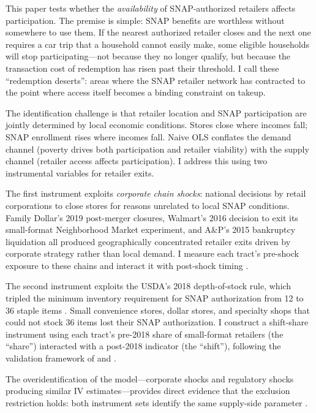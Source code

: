 \documentclass[12pt]{article}
\begin{document}
This paper tests whether the \textit{availability} of SNAP-authorized retailers affects participation. The premise is simple: SNAP benefits are worthless without somewhere to use them. If the nearest authorized retailer closes and the next one requires a car trip that a household cannot easily make, some eligible households will stop participating---not because they no longer qualify, but because the transaction cost of redemption has risen past their threshold. I call these ``redemption deserts'': areas where the SNAP retailer network has contracted to the point where access itself becomes a binding constraint on takeup.

The identification challenge is that retailer location and SNAP participation are jointly determined by local economic conditions. Stores close where incomes fall; SNAP enrollment rises where incomes fall. Naive OLS conflates the demand channel (poverty drives both participation and retailer viability) with the supply channel (retailer access affects participation). I address this using two instrumental variables for retailer exits.

The first instrument exploits \textit{corporate chain shocks}: national decisions by retail corporations to close stores for reasons unrelated to local SNAP conditions. Family Dollar's 2019 post-merger closures, Walmart's 2016 decision to exit its small-format Neighborhood Market experiment, and A\&P's 2015 bankruptcy liquidation all produced geographically concentrated retailer exits driven by corporate strategy rather than local demand. I measure each tract's pre-shock exposure to these chains and interact it with post-shock timing \citep{borusyak2022}.

The second instrument exploits the USDA's 2018 depth-of-stock rule, which tripled the minimum inventory requirement for SNAP authorization from 12 to 36 staple items \citep{fns2018}. Small convenience stores, dollar stores, and specialty shops that could not stock 36 items lost their SNAP authorization. I construct a shift-share instrument using each tract's pre-2018 share of small-format retailers (the ``share'') interacted with a post-2018 indicator (the ``shift''), following the validation framework of \citet{borusyak2022} and \citet{goldsmith2020}.

The overidentification of the model---corporate shocks and regulatory shocks producing similar IV estimates---provides direct evidence that the exclusion restriction holds: both instrument sets identify the same supply-side parameter \citep{stock2005}.
\end{document}
